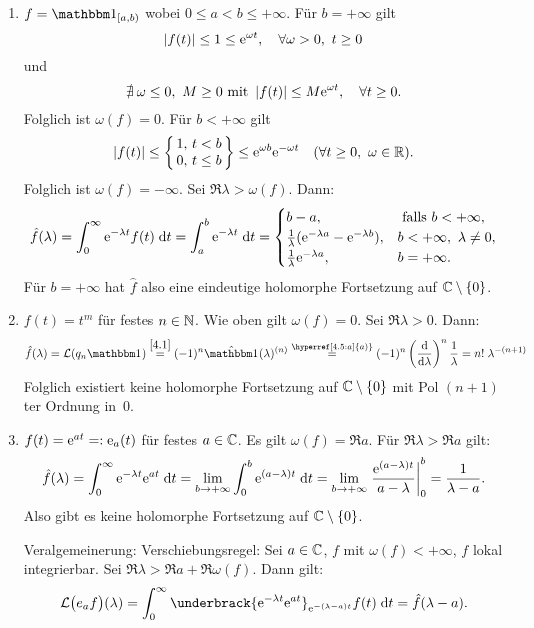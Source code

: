 \documentclass[a4paper,twoside,DIV15,BCOR12mm]{scrbook}
\begin{document}
\begin{bsp}\label{bsp4.5}\begin{enumerate}
\item\label{4.5:a} $f = \charfnkt{[a,b)}$ wobei $0\leq a<b\leq+\infty$. Für $b=+\infty$ gilt
\[\left\lvert f(t)\right\lvert\leq 1\leq\mathrm{e}^{\omega t},\quad\forall\omega>0,\ t\geq 0\]
und
\[\nexists\:\omega\leq0,\ M\geq0\text{ mit }\left\lvert f(t)\right\lvert\leq M\mathrm{e}^{\omega t},\quad\forall t\geq0.\]
Folglich ist $\omega(f)=0$. Für $b<+\infty$ gilt
\[\abs{f(t)}\leq\left\{\!\!\begin{array}{r @{,\ } l}1&t<b\\0&t\leq b\end{array}\!\!\right\}\leq\e^{\omega b}\e^{-\omega t}\quad(\forall t\geq0,\ \omega\in\R).\]
Folglich ist $\omega(f)=-\infty$. Sei $\Re{\lambda}>\omega(f)$. Dann:
\[\hat{f}(\lambda)=\int_{0}^{\infty}{\mathrm{e}^{-\lambda t}f(t)}\;\mathrm{d} t = \int_{a}^{b}{\mathrm{e}^{-\lambda t}}\;\mathrm{d} t=\begin{cases}b-a,&\text{ falls }b<+\infty,\\\frac{1}{\lambda}(\mathrm{e}^{-\lambda a}-\mathrm{e}^{-\lambda b}),&b<+\infty,\ \lambda\neq 0,\\\frac{1}{\lambda}\mathrm{e}^{-\lambda a},&b=+\infty.\end{cases}\]
Für $b=+\infty$ hat $\hat{f}$ also eine eindeutige holomorphe Fortsetzung auf $\mathbb{C}\setminus\{0\}$.

\item $f(t) = t^m$ für festes $n\in\mathbb{N}$. Wie oben gilt $\omega(f)=0$. Sei $\Re{\lambda}>0$. Dann:
\[\hat{f}(\lambda)=\L(q_n\charfnkt{})\overset{\eqref{4.1}}{=}(-1)^n\hat{\charfnkt{}}(\lambda)^{(n)}\overset{\hyperref[4.5:a]{a)}}{=}(-1)^n\left(\frac{\d}{\d\lambda}\right)^n\frac{1}{\lambda} = n!\;\lambda^{-(n+1)}\]
Folglich existiert keine holomorphe Fortsetzung auf $\mathbb{C}\setminus\{0\}$ mit Pol $(n+1)$ter Ordnung in~0.

\item\label{4.5:c} $f(t)=\mathrm{e}^{at}=:\mathrm{e}_a(t)$ für festes $a\in\mathbb{C}$. Es gilt $\omega(f)=\Re{a}$. Für $\Re{\lambda}>\Re{a}$ gilt:
\[\hat{f}(\lambda) = \int_{0}^{\infty}{\mathrm{e}^{-\lambda t}\mathrm{e}^{at}}\;\mathrm{d} t = \lim_{b\to+\infty}\int_{0}^{b}{\mathrm{e}^{(a-\lambda) t}}\;\mathrm{d} t = \lim_{b\to+\infty}\left.\frac{\mathrm{e}^{(a-\lambda)t}}{a-\lambda}\right|_0^b=\frac{1}{\lambda-a}.\]
Also gibt es keine holomorphe Fortsetzung auf $\mathbb{C}\setminus\{0\}$.

Veralgemeinerung: Verschiebungsregel: Sei $a\in\mathbb{C}$, $f$ mit $\omega(f)<+\infty$, $f$ lokal integrierbar. Sei $\Re{\lambda}>\Re{a}+\Re{\omega(f)}$. Dann gilt:
\begin{equation}\label{4.6}
\L\bigl(e_af\bigr)(\lambda) = \integral{0}{\infty}{\underbrack{\e^{-\lambda t}\e^{at}}_{\e^{-(\lambda-a)t}}f(t)}{t} = \hat{f}(\lambda-a).
\end{equation}


\end{enumerate}
\end{bsp}
\end{document}

